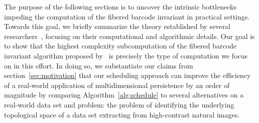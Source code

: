 \documentclass{article} %
\begin{document}
The purpose of the following sections is to uncover the intrinsic bottlenecks impeding the computation of the fibered barcode invariant in practical settings. Towards this goal, we briefly summarize the theory established by several researchers~\cite{lesnick2015interactive, carlsson2010computing, landi2014rank}, focusing on their computational and algorithmic details. 
Our goal is to show that the highest complexity subcomputation of the fibered barcode invariant algorithm proposed by~\cite{lesnick2015interactive} is precisely the type of computation we focus on in this effort. 
In doing so, we substantiate our claims from section~\ref{sec:motivation} that our scheduling approach can improve the efficiency of a real-world application of multidimensional persistence by an order of magnitude by comparing Algorithm~\ref{alg:schedule} to several alternatives on a real-world data set and problem: the problem of identifying the underlying topological space of a data set extracting from high-contrast natural images. 

\end{document}
